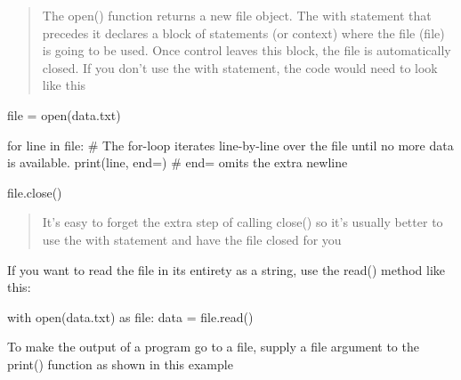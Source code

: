 \documentclass[
  letterpaper,
  DIV=11,
  numbers=noendperiod]{scrreprt}
\newenvironment{Shaded}{\begin{snugshade}}{\end{snugshade}}
\newcommand{\BuiltInTok}[1]{\textcolor[rgb]{0.00,0.46,0.62}{#1}}
\newcommand{\CommentTok}[1]{\textcolor[rgb]{0.37,0.37,0.37}{#1}}
\newcommand{\ControlFlowTok}[1]{\textcolor[rgb]{0.00,0.46,0.62}{#1}}
\newcommand{\ImportTok}[1]{\textcolor[rgb]{0.00,0.46,0.62}{#1}}
\newcommand{\KeywordTok}[1]{\textcolor[rgb]{0.00,0.46,0.62}{#1}}
\newcommand{\NormalTok}[1]{\textcolor[rgb]{0.00,0.46,0.62}{#1}}
\newcommand{\OperatorTok}[1]{\textcolor[rgb]{0.37,0.37,0.37}{#1}}
\newcommand{\StringTok}[1]{\textcolor[rgb]{0.13,0.47,0.30}{#1}}
\begin{document}
\begin{quote}
The open() function returns a new file object. The with statement that
precedes it declares a block of statements (or context) where the file
(file) is going to be used. Once control leaves this block, the file is
automatically closed. If you don't use the with statement, the code
would need to look like this
\end{quote}

\begin{Shaded}
\begin{Highlighting}[]
\BuiltInTok{file} \OperatorTok{=} \BuiltInTok{open}\NormalTok{(}\StringTok{\textquotesingle{}data.txt\textquotesingle{}}\NormalTok{) }

\ControlFlowTok{for}\NormalTok{ line }\KeywordTok{in} \BuiltInTok{file}\NormalTok{: }\CommentTok{\# The for{-}loop iterates line{-}by{-}line over the file until no   more data is    available.}
    \BuiltInTok{print}\NormalTok{(line, end}\OperatorTok{=}\StringTok{\textquotesingle{}\textquotesingle{}}\NormalTok{) }\CommentTok{\#   end=\textquotesingle{}\textquotesingle{}  omits   the extra   newline }

\BuiltInTok{file}\NormalTok{.close()}
\end{Highlighting}
\end{Shaded}

\begin{quote}
It's easy to forget the extra step of calling close() so it's usually
better to use the with statement and have the file closed for you
\end{quote}

If you want to read the file in its entirety as a string, use the read()
method like this:

\begin{Shaded}
\begin{Highlighting}[]
\ControlFlowTok{with} \BuiltInTok{open}\NormalTok{(}\StringTok{\textquotesingle{}data.txt\textquotesingle{}}\NormalTok{) }\ImportTok{as}    \BuiltInTok{file}\NormalTok{:}
\NormalTok{    data }\OperatorTok{=} \BuiltInTok{file}\NormalTok{.read()}
\end{Highlighting}
\end{Shaded}

To make the output of a program go to a file, supply a file argument to
the print() function as shown in this example
\end{document}
